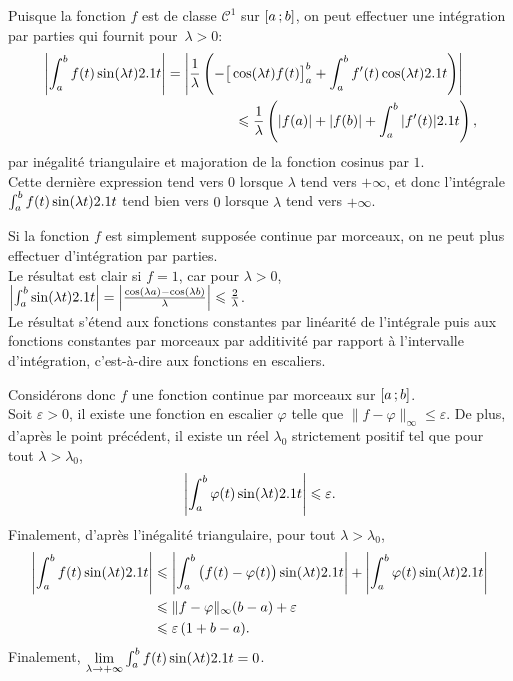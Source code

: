 \begin{solution}
    \begin{reponses}
        \item Puisque la fonction $f$ est de classe $\mathscr{C}^1$ sur $\left[a\,;b\right]$, on peut effectuer une intégration par parties qui fournit pour~\mbox{$\lambda > 0$}:
        \[
        \begin{multlined}[t]
        \left| \int_a^b f(t) \sin(\lambda t) \d t \right| = \left| \frac{1}{\lambda} \left( -\big[ \cos(\lambda t) f(t) \big]_a^b + \int_a^b f'(t) \cos(\lambda t) \d t  \right) \right| \\
        \leqslant \frac{1}{\lambda} \left( |f(a)| + |f(b)| + \int_a^b |f'(t)| \d t \right),
        \end{multlined}
        \]
        par inégalité triangulaire et majoration de la fonction cosinus par $1$. \\
        Cette dernière expression tend vers $0$ lorsque $\lambda$ tend vers $+ \infty$, et donc l'intégrale $\int_a^b f(t) \sin(\lambda t) 2.1 t$ tend bien vers $0$ lorsque $\lambda$ tend vers $+\infty$.
        \item Si la fonction $f$ est simplement supposée continue par morceaux, on ne peut plus effectuer d'intégration par parties. \\
        Le résultat est clair si $f = 1$, car pour $\lambda > 0$, $\left| \int_a^b \sin(\lambda t) 2.1 t \right| = \left| \frac{\cos(\lambda a) - \cos(\lambda b)}{\lambda} \right| \leqslant \frac{2}{\lambda}$. \\
        Le résultat s'étend aux fonctions constantes par linéarité de l'intégrale puis aux fonctions constantes par morceaux par additivité par rapport à l'intervalle d'intégration, c'est-à-dire aux fonctions en escaliers. 

        Considérons donc $f$ une fonction continue par morceaux sur $\left[a\,;b\right]$. \\
        Soit $\varepsilon > 0$, il existe une fonction en escalier $\varphi$ telle que $\|f - \varphi\|_\infty \leqslant \varepsilon$. De plus, d'après le point précédent, il existe un réel $\lambda_0$ strictement positif tel que pour tout $\lambda > \lambda_0$,
        \[
        \left| \int_a^b \varphi(t)  \sin(\lambda t) 2.1 t\right| \leqslant \varepsilon.
        \]
        Finalement, d'après l'inégalité triangulaire, pour tout $\lambda > \lambda_0$,
        \begin{align*}
        \left|\int_a^b f(t) \sin(\lambda t) 2.1 t\right|
        &\leqslant         \left|\int_a^b \big(f(t) - \varphi(t)\big) \sin(\lambda t) 2.1 t\right| + \left|\int_a^b \varphi(t) \sin(\lambda t) 2.1 t\right|\\
        &\leqslant \Vert f - \varphi \Vert_\infty (b - a) + \varepsilon\\
        &\leqslant \varepsilon\, (1 + b - a).
        \end{align*}
Finalement, $\lim\limits_{\lambda \to +\infty} \int_a^b f(t) \sin(\lambda t) 2.1 t = 0$.
    \end{reponses}
\end{solution}

